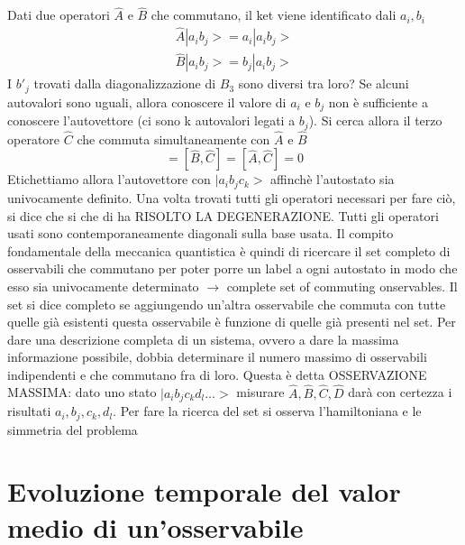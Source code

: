 Dati due operatori $\hat{A}$ e $\hat{B}$ che commutano, il ket viene identificato dali $a_i,b_i$
\begin{align*}
    \hat{A}|a_ib_j> = a_i |a_ib_j> \\
    \hat{B}|a_ib_j> = b_j |a_ib_j>
\end{align*}
I $b'_j$ trovati dalla diagonalizzazione di $B_3$ sono diversi tra loro? Se alcuni autovalori sono uguali, allora conoscere il valore di $a_i$ e $b_j$ non è sufficiente a conoscere l'autovettore (ci sono k autovalori legati a $b_j$). Si cerca allora il terzo operatore $\hat{C}$ che commuta simultaneamente con $\hat{A}$ e $\hat{B}$
\begin{equation*}
    [\hat{A},\hat{B}] = [\hat{B}, \hat{C}] = [\hat{A}, \hat{C}] = 0
\end{equation*}
Etichettiamo allora l'autovettore con $|a_ib_jc_k>$ affinchè l'autostato sia univocamente definito. Una volta trovati tutti gli operatori necessari per fare ciò, si dice che si che di ha RISOLTO LA DEGENERAZIONE. Tutti gli operatori usati sono contemporaneamente diagonali sulla base usata. \newline
Il compito fondamentale della meccanica quantistica è quindi di ricercare il set completo di osservabili che commutano per poter porre un label a ogni autostato in modo che esso sia univocamente determinato $\rightarrow$ complete set of commuting onservables. Il set si dice completo se aggiungendo un'altra osservabile che commuta con tutte quelle già esistenti questa osservabile è funzione di quelle già presenti nel set. \newline
Per dare una descrizione completa di un sistema, ovvero a dare la massima informazione possibile, dobbia determinare il numero massimo di osservabili indipendenti e che commutano fra di loro. Questa è detta OSSERVAZIONE MASSIMA: dato uno stato $|a_ib_jc_kd_l \dots>$ misurare $\hat{A},\hat{B},\hat{C},\hat{D}$ darà con certezza i risultati $a_i,b_j,c_k,d_l$. Per fare la ricerca del set si osserva l'hamiltoniana e le simmetria del problema

\chapter{Evoluzione temporale del valor medio di un'osservabile}

